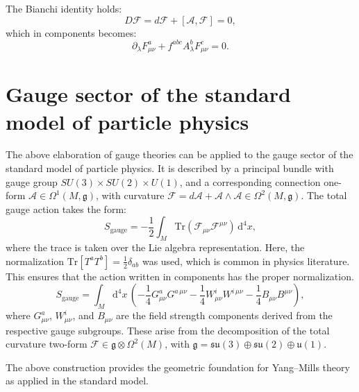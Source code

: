 The Bianchi identity holds:
\[
D\mathscr{F} = d\mathscr{F} + [\mathcal{A}, \mathscr{F}] = 0,
\]
which in components becomes:
\[
\partial_\lambda F_{\mu\nu}^a + f^{abc} A_\lambda^b F_{\mu\nu}^c = 0.
\]


\section{Gauge sector of the standard model of particle physics}

The above elaboration of gauge theories can be applied to the gauge sector of the standard model of particle physics. It is described by a principal bundle with gauge group \( SU(3) \times SU(2) \times U(1) \), and a corresponding connection one-form \( \mathcal{A} \in \Omega^1(M, \mathfrak{g}) \), with curvature \( \mathscr{F} = d\mathcal{A} + \mathcal{A} \wedge \mathcal{A} \in \Omega^2(M, \mathfrak{g}) \). The total gauge action takes the form:
\[
S_{\text{gauge}} = -\frac{1}{2} \int_M \mathrm{Tr}(\mathscr{F}_{\mu\nu} \mathscr{F}^{\mu\nu}) \, \mathrm{d}^4x,
\]
where the trace is taken over the Lie algebra representation. Here, the normalization $\text{Tr}[T^aT^b]=\frac12\delta_{ab}$ was used, which is common in physics literature. This ensures that the action written in components has the proper normalization.
\[
S_{\text{gauge}} = \int_M \mathrm{d}^4x \, \left( 
  -\frac{1}{4} G_{\mu\nu}^{a} G^{a\,\mu\nu} 
  -\frac{1}{4} W_{\mu\nu}^{i} W^{i\,\mu\nu} 
  -\frac{1}{4} B_{\mu\nu} B^{\mu\nu} 
\right),
\]
where \( G_{\mu\nu}^a \), \( W_{\mu\nu}^i \), and \( B_{\mu\nu} \) are the field strength components derived from the respective gauge subgroups. These arise from the decomposition of the total curvature two-form \( \mathscr{F} \in \mathfrak{g} \otimes \Omega^2(M) \), with \( \mathfrak{g} = \mathfrak{su}(3) \oplus \mathfrak{su}(2) \oplus \mathfrak{u}(1) \).

The above construction provides the geometric foundation for Yang–Mills theory as applied in the standard model.
